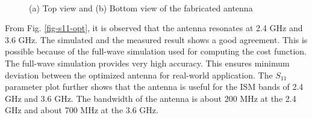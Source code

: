 \begin{figure}
\centering
{}~~~
\\
\caption{(a) Top view and (b) Bottom view of the fabricated antenna}\label{h-shaped-fab}
\end{figure}

From Fig. \ref{fig-s11-opt}, it is observed that the antenna resonates at 2.4 GHz and 3.6 GHz. The simulated and the measured result shows a good agreement. This is possible because of the full-wave simulation used for computing the cost function. The full-wave simulation provides very high accuracy. This ensures minimum deviation between the optimized antenna for real-world application. The $S_{11}$ parameter plot further shows that the antenna is useful for the ISM bands of 2.4 GHz and 3.6 GHz. The bandwidth of the antenna is about 200 MHz at the 2.4 GHz and about 700 MHz at the 3.6 GHz.

